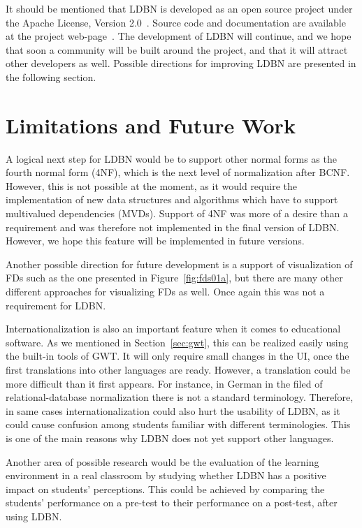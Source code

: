 It should be mentioned that LDBN is developed as an open source project 
under the Apache License, Version 2.0~\cite{walv2}. 
Source code and documentation are available at the project web-page~\cite{wldbnp}. 
The development of LDBN will continue, and we
hope that soon a community will be
built around the project, and that it will attract other developers as well. Possible directions for 
improving LDBN are presented in the following section. 

\section{Limitations and Future Work}
A logical next step for LDBN would be to support
other normal forms as the fourth normal form (4NF), which is the next level 
of normalization after BCNF.
However, this is not possible at the moment, as it would
require the implementation of new data structures and algorithms which have to 
support multivalued dependencies (MVDs). Support of 4NF was more of a desire than a requirement and
was therefore not implemented in the final version of LDBN. However, we hope this feature will be implemented
in future versions. 

Another possible direction for future development is a support of visualization of FDs such as the
one presented in Figure~\ref{fig:fds01a}, but there are many other different approaches for visualizing FDs as well.
Once again this was not a requirement for LDBN. 

Internationalization is also an important feature when it comes to educational software.
As we mentioned in Section~\ref{sec:gwt}, this can be realized easily using the built-in tools of GWT.
It will only require 
small changes in the UI, once the first translations into other languages are ready. However, a translation 
could be more difficult than it first appears. For instance, in German in the filed of relational-database
normalization
there is not a standard terminology. Therefore,
in same cases internationalization could also hurt the usability 
of LDBN, as it could cause confusion among students familiar with different terminologies.
This is one of the main reasons why LDBN does not yet support other languages.

Another area of possible research would be the evaluation of the learning environment 
in a real classroom by
studying whether LDBN has a positive impact on students' perceptions.
This could be achieved by comparing the students' performance on a pre-test to their
performance on a post-test, after using LDBN.  
